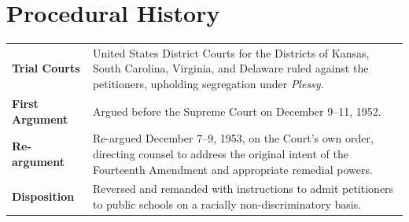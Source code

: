 \section{Procedural History}

\begin{tabularx}{\linewidth}{@{}>{\color{accent}\bfseries}l@{\hspace{8mm}}>{\raggedright\arraybackslash}X@{}}
  Trial Courts    & United States District Courts for the Districts of Kansas, South Carolina,
                    Virginia, and Delaware ruled against the petitioners, upholding segregation
                    under \textit{Plessy}.                                                         \\[3pt]
  First Argument  & Argued before the Supreme Court on December 9--11, 1952.                       \\[3pt]
  Re-argument     & Re-argued December 7--9, 1953, on the Court's own order, directing
                    counsel to address the original intent of the Fourteenth Amendment and
                    appropriate remedial powers.                                                    \\[3pt]
  Disposition     & Reversed and remanded with instructions to admit petitioners
                    to public schools on a racially non-discriminatory basis.                       \\
\end{tabularx}

